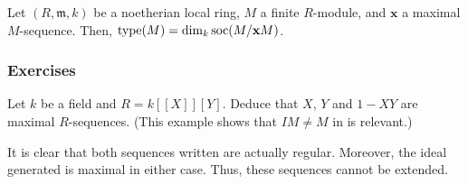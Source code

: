 \documentclass[12pt]{article}
\begin{document}
\begin{por}
	Let $(R, \mathfrak{m}, k)$ be a noetherian local ring, $M$ a finite $R$-module, and $\mathbf{x}$ a maximal $M$-sequence. Then, $\operatorname{type}(M) = \dim_{k} \operatorname{soc}(M/\mathbf{x} M)$.
\end{por}

\subsubsection{Exercises}

\begin{exe}
	Let $k$ be a field and $R = k[\![X]\!][Y]$. Deduce that $X$, $Y$ and $1 - XY$ are maximal $R$-sequences. (This example shows that $IM \neq M$ in  is relevant.)
\end{exe}
\begin{soln}
	It is clear that both sequences written are actually regular. Moreover, the ideal generated is maximal in either case. Thus, these sequences cannot be extended.
\end{soln}
\end{document}
